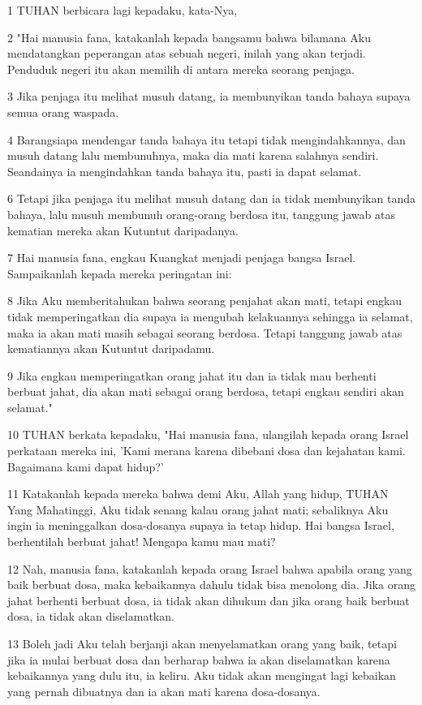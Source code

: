\par 1 TUHAN berbicara lagi kepadaku, kata-Nya,
\par 2 "Hai manusia fana, katakanlah kepada bangsamu bahwa bilamana Aku mendatangkan peperangan atas sebuah negeri, inilah yang akan terjadi. Penduduk negeri itu akan memilih di antara mereka seorang penjaga.
\par 3 Jika penjaga itu melihat musuh datang, ia membunyikan tanda bahaya supaya semua orang waspada.
\par 4 Barangsiapa mendengar tanda bahaya itu tetapi tidak mengindahkannya, dan musuh datang lalu membunuhnya, maka dia mati karena salahnya sendiri. Seandainya ia mengindahkan tanda bahaya itu, pasti ia dapat selamat.
\par 6 Tetapi jika penjaga itu melihat musuh datang dan ia tidak membunyikan tanda bahaya, lalu musuh membunuh orang-orang berdosa itu, tanggung jawab atas kematian mereka akan Kutuntut daripadanya.
\par 7 Hai manusia fana, engkau Kuangkat menjadi penjaga bangsa Israel. Sampaikanlah kepada mereka peringatan ini:
\par 8 Jika Aku memberitahukan bahwa seorang penjahat akan mati, tetapi engkau tidak memperingatkan dia supaya ia mengubah kelakuannya sehingga ia selamat, maka ia akan mati masih sebagai seorang berdosa. Tetapi tanggung jawab atas kematiannya akan Kutuntut daripadamu.
\par 9 Jika engkau memperingatkan orang jahat itu dan ia tidak mau berhenti berbuat jahat, dia akan mati sebagai orang berdosa, tetapi engkau sendiri akan selamat."
\par 10 TUHAN berkata kepadaku, "Hai manusia fana, ulangilah kepada orang Israel perkataan mereka ini, 'Kami merana karena dibebani dosa dan kejahatan kami. Bagaimana kami dapat hidup?'
\par 11 Katakanlah kepada mereka bahwa demi Aku, Allah yang hidup, TUHAN Yang Mahatinggi, Aku tidak senang kalau orang jahat mati; sebaliknya Aku ingin ia meninggalkan dosa-dosanya supaya ia tetap hidup. Hai bangsa Israel, berhentilah berbuat jahat! Mengapa kamu mau mati?
\par 12 Nah, manusia fana, katakanlah kepada orang Israel bahwa apabila orang yang baik berbuat dosa, maka kebaikannya dahulu tidak bisa menolong dia. Jika orang jahat berhenti berbuat dosa, ia tidak akan dihukum dan jika orang baik berbuat dosa, ia tidak akan diselamatkan.
\par 13 Boleh jadi Aku telah berjanji akan menyelamatkan orang yang baik, tetapi jika ia mulai berbuat dosa dan berharap bahwa ia akan diselamatkan karena kebaikannya yang dulu itu, ia keliru. Aku tidak akan mengingat lagi kebaikan yang pernah dibuatnya dan ia akan mati karena dosa-dosanya.
